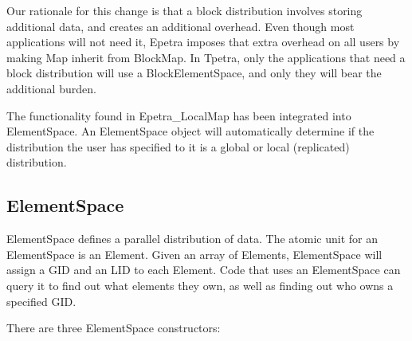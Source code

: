 \documentclass[10pt,relax]{TpetraDesign}
\begin{document}
Our rationale for this change is that a block distribution involves storing additional data, and creates an additional overhead. Even though most applications will not need it, Epetra imposes that extra overhead on all users by making Map inherit from BlockMap. In Tpetra, only the applications that need a block distribution will use a BlockElementSpace, and only they will bear the additional burden.

The functionality found in Epetra\_LocalMap has been integrated into ElementSpace. An ElementSpace object will automatically determine if the distribution the user has specified to it is a global or local (replicated) distribution.

%
\subsection{ElementSpace}
ElementSpace defines a parallel distribution of data. The atomic unit for an ElementSpace is an Element. Given an array of Elements, ElementSpace will assign a GID and an LID to each Element. Code that uses an ElementSpace can query it to find out what elements they own, as well as finding out who owns a specified GID.

There are three ElementSpace constructors:
\end{document}
